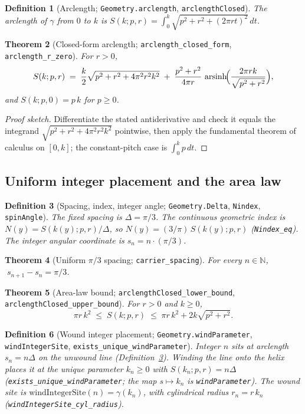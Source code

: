 \documentclass[11pt]{article}
\newtheorem{definition}{Definition}[section]
\newtheorem{theorem}[definition]{Theorem}
\newcommand{\N}{\mathbb{N}}
\newcommand{\code}[1]{\texttt{#1}}
\begin{document}
\begin{definition}[Arclength; \code{Geometry.arclength}, \code{arclengthClosed}]\label{def:arclength}
The arclength of $\gamma$ from $0$ to $k$ is
$\displaystyle S(k;p,r)=\int_0^k\sqrt{p^2+r^2+(2\pi r t)^2}\,dt$.
\end{definition}

\begin{theorem}[Closed-form arclength; \code{arclength\_closed\_form}, \code{arclength\_r\_zero}]\label{thm:arclength}
For $r>0$,
\[
  S(k;p,r) \;=\; \frac{k}{2}\sqrt{p^2+r^2+4\pi^2 r^2 k^2}
   \;+\;\frac{p^2+r^2}{4\pi r}\,\operatorname{arsinh}\!\Bigl(\frac{2\pi r k}{\sqrt{p^2+r^2}}\Bigr),
\]
and $S(k;p,0)=p\,k$ for $p\ge 0$.
\end{theorem}

\begin{proof}[Proof sketch]
Differentiate the stated antiderivative and check it equals the integrand
$\sqrt{p^2+r^2+4\pi^2r^2k^2}$ pointwise, then apply the fundamental theorem of calculus on
$[0,k]$; the constant-pitch case is $\int_0^k p\,dt$.
\end{proof}

\subsection{Uniform integer placement and the area law}

\begin{definition}[Spacing, index, integer angle; \code{Geometry.Delta}, \code{Nindex}, \code{spinAngle}]\label{def:placement}
The fixed spacing is $\Delta=\pi/3$. The continuous geometric index is $N(y)=S(k(y);p,r)/\Delta$,
so $N(y)=(3/\pi)\,S(k(y);p,r)$ (\code{Nindex\_eq}). The integer angular coordinate is
$s_n=n\cdot(\pi/3)$.
\end{definition}

\begin{theorem}[Uniform $\pi/3$ spacing; \code{carrier\_spacing}]\label{thm:spacing}
For every $n\in\N$, $\;s_{n+1}-s_n=\pi/3$.
\end{theorem}

\begin{theorem}[Area-law bound; \code{arclengthClosed\_lower\_bound}, \code{arclengthClosed\_upper\_bound}]\label{thm:areabound}
For $r>0$ and $k\ge 0$,
\[
  \pi r\,k^2 \;\le\; S(k;p,r) \;\le\; \pi r\,k^2 + 2k\sqrt{p^2+r^2}.
\]
\end{theorem}

\begin{definition}[Wound integer placement; \code{Geometry.windParameter}, \code{windIntegerSite}, \code{exists\_unique\_windParameter}]\label{def:wound}
Integer $n$ sits at arclength $s_n=n\Delta$ on the unwound line (Definition~\ref{def:placement}).
\emph{Winding the line onto the helix} places it at the unique parameter $k_n\ge 0$ with
$S(k_n;p,r)=n\Delta$ (\code{exists\_unique\_windParameter}; the map $s\mapsto k_n$ is
\code{windParameter}). The wound site is $\mathrm{windIntegerSite}(n)=\gamma(k_n)$, with cylindrical
radius $r_n=r\,k_n$ (\code{windIntegerSite\_cyl\_radius}).
\end{definition}
\end{document}
